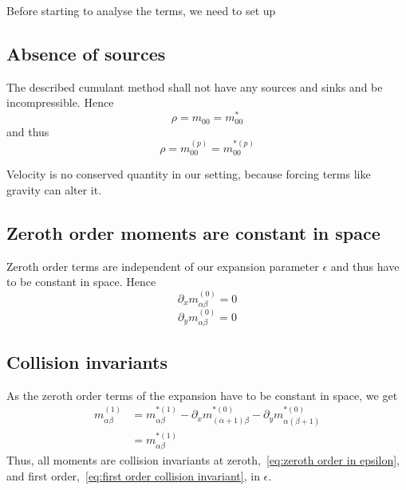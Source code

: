 
Before starting to analyse the terms, we need to set up
\subsection{Absence of sources}
\label{sub:Absence of sources}
The described cumulant method shall not have any sources and sinks and be incompressible. Hence
\begin{equation}
    \rho  = m_{00} = m_{00}^*
\end{equation}
and thus
\begin{equation}
    \rho = m_{00}^{(p)} = m_{00}^{*(p)}
\end{equation}

Velocity is no conserved quantity in our setting, because forcing terms like gravity can alter it.

\subsection{Zeroth order moments are constant in space}
\label{sub:Zeroth order moments are constant in space}
Zeroth order terms are independent of our expansion parameter $\epsilon$ and thus have to be constant in space. Hence
\begin{equation}
  \partial_x m_{\alpha\beta}^{(0)} = 0
\end{equation}
\begin{equation}
  \partial_y m_{\alpha\beta}^{(0)} = 0
\end{equation}


\subsection{Collision invariants}
\label{sub:Collision invariants}
As the zeroth order terms of the expansion have to be constant in space, we get
\begin{equation}
  \label{eq:first order collision invariant}
  \begin{aligned}
    m_{\alpha\beta}^{(1)}
    & = m_{\alpha\beta}^{*(1)}
    - \partial_x m_{(\alpha+1)\beta}^{*(0)}
    - \partial_y m_{\alpha(\beta+1)}^{*(0)} \\
    & = m_{\alpha\beta}^{*(1)}
  \end{aligned}
\end{equation}
Thus, all moments are collision invariants at zeroth,~\eqref{eq:zeroth order in epsilon}, and first order,~\eqref{eq:first order collision invariant}, in $\epsilon$.
